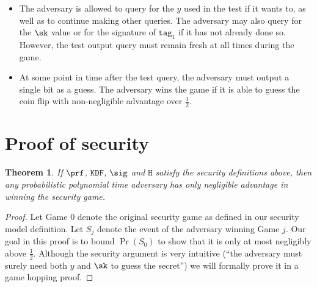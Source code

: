 \documentclass{article}
\newtheorem{theorem}{Theorem}[section]
\begin{document}
{\begin{itemize}
	We also say that an \texttt{output} query is "non-trivial" if one of the following conditions is satisfied
	
	\begin{itemize}
		\item this query is of the first type $\texttt{tag}_1, \texttt{tag}_2, y, n$ where query with $\texttt{tag}_1, \texttt{tag}_2, y$ has not been made before. 
		
		\item this query is of the second type $\texttt{tag}_1, \texttt{tag}_2, n$.  
	\end{itemize}
	
	
	At some point in time, the adversary must make a so-called test \texttt{output} query. This is the same as a normal non-trivial \texttt{output} query except the challenger flips an unbiased coin and either responds with the genuine output using the wrapper, or a uniformly randomly chosen string of the same length. 
	
	\item The adversary is allowed to query for the $y$ used in the test if it wants to, as well as to continue making other queries. The adversary may also query for the $\sk$ value or for the signature of $\texttt{tag}_1$ if it has not already done so. However, the test output query must remain fresh at all times during the game.
	
	\item At some point in time after the test query, the adversary must output a single bit as a guess. The adversary wins the game if it is able to guess the coin flip with non-negligible advantage over $\frac{1}{2}$.
\end{itemize}

\section{Proof of security} \label{proof}

\begin{theorem}
If $\prf$, $\texttt{KDF}$, $\sig$ and $\texttt{H}$ satisfy the security definitions above, then any probabilistic polynomial time adversary has only negligible advantage in winning the security game.	
\end{theorem}

\begin{proof}
	Let Game 0 denote the original security game as defined in our security model definition. Let $S_j$ denote the event of the adversary winning Game $j$. Our goal in this proof is to bound $\Pr(S_0)$ to show that it is only at most negligibly above $\frac{1}{2}$. Although the security argument is very intuitive (``the adversary must surely need both $y$ and $\sk$ to guess the secret'') we will formally prove it in a game hopping proof.


\end{proof}}
\end{document}
